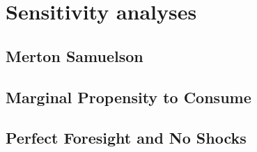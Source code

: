 \documentclass[../CGMPort.tex]{subfiles}
\begin{document}
\section{Sensitivity analyses}\label{sec:Sensitivity}

\subsection{Merton Samuelson}

\subsection{Marginal Propensity to Consume}

\subsection{Perfect Foresight and No Shocks}
\end{document}
